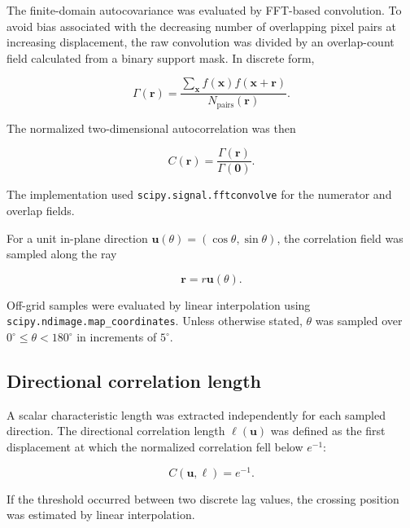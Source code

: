 \documentclass{article}
\begin{document}
The finite-domain autocovariance was evaluated by FFT-based convolution. To avoid bias associated with the decreasing number of overlapping pixel pairs at increasing displacement, the raw convolution was divided by an overlap-count field calculated from a binary support mask. In discrete form,

\begin{equation}
    \Gamma(\mathbf{r})
    =
    \frac{
    \sum_{\mathbf{x}}
    f(\mathbf{x})f(\mathbf{x}+\mathbf{r})
    }{
    N_{\mathrm{pairs}}(\mathbf{r})
    }.
\end{equation}

The normalized two-dimensional autocorrelation was then

\begin{equation}
    C(\mathbf{r})
    =
    \frac{\Gamma(\mathbf{r})}{\Gamma(\mathbf{0})}.
\end{equation}

The implementation used
\texttt{scipy.signal.fftconvolve} for the numerator and overlap fields.

For a unit in-plane direction
$\mathbf{u}(\theta)=(\cos\theta,\sin\theta)$,
the correlation field was sampled along the ray

\begin{equation}
    \mathbf{r}=r\mathbf{u}(\theta).
\end{equation}

Off-grid samples were evaluated by linear interpolation using
\texttt{scipy.ndimage.map\_coordinates}. Unless otherwise stated,
$\theta$ was sampled over $0^\circ\leq\theta<180^\circ$ in increments of
$5^\circ$.

\subsection{Directional correlation length}
\label{sec:SI_corr_length}

A scalar characteristic length was extracted independently for each sampled direction. The directional correlation length
$\ell(\mathbf{u})$ was defined as the first displacement at which the normalized correlation fell below $e^{-1}$:

\begin{equation}
    C(\mathbf{u},\ell)=e^{-1}.
\end{equation}

If the threshold occurred between two discrete lag values,
the crossing position was estimated by linear interpolation.
\end{document}
